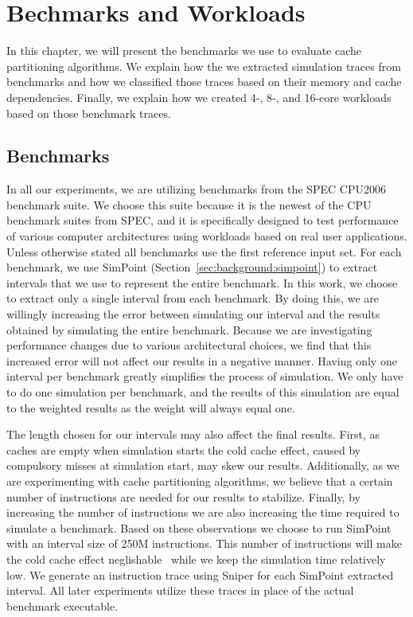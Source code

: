 
\chapter{Bechmarks and Workloads}
\label{cpt:benchmarks_workloads}

In this chapter, we will present the benchmarks we use to evaluate cache partitioning algorithms.
We explain how the we extracted simulation traces from benchmarks and how we classified those traces based on their memory and cache dependencies. Finally, we explain how we created 4-, 8-, and 16-core workloads based on those benchmark traces.

\section{Benchmarks}

In all our experiments, we are utilizing benchmarks from the SPEC CPU2006~\cite{SPECCPU2006} benchmark suite. 
We choose this suite because it is the newest of the CPU benchmark suites from SPEC, and it is specifically designed to test performance of various computer architectures using workloads based on real user applications.
Unless otherwise stated all benchmarks use the first reference input set.
For each benchmark, we use SimPoint\cite{Hamerly2005} (Section~\ref{sec:background:simpoint}) to extract intervals that we use to represent the entire benchmark.
In this work, we choose to extract only a single interval from each benchmark.
By doing this, we are willingly increasing the error\cite{Hamerly2004} between simulating our interval and the results obtained by simulating the entire benchmark.
Because we are investigating performance changes due to various architectural choices, we find that this increased error will not affect our results in a negative manner.
Having only one interval per benchmark greatly simplifies the process of simulation.
We only have to do one simulation per benchmark, and the results of this simulation are equal to the weighted results as the weight will always equal one.

The length chosen for our intervals may also affect the final results.
First, as caches are empty when simulation starts the cold cache effect, caused by compulsory misses at simulation start, may skew our results.
Additionally, as we are experimenting with cache partitioning algorithms, we believe that a certain number of instructions are needed for our results to stabilize.
Finally, by increasing the number of instructions we are also increasing the time required to simulate a benchmark.
Based on these observations we choose to run SimPoint with an interval size of 250M instructions.
This number of instructions will make the cold cache effect neglishable~\cite{Hamerly2005,Hamerly2004,Olsen2014} while we keep the simulation time relatively low.
We generate an instruction trace using Sniper for each SimPoint extracted interval.
All later experiments utilize these traces in place of the actual benchmark executable.

